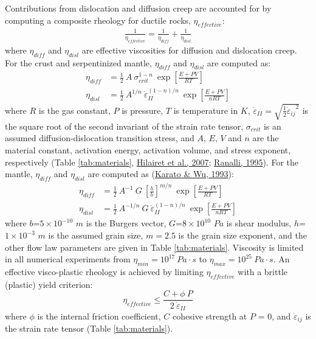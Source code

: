 Contributions from dislocation and diffusion creep are accounted for by computing a composite rheology for ductile rocks, \(\eta_{effective}\):
\begin{equation}
  \begin{aligned}
    \frac{1}{\eta_{effective}} = \frac{1}{\eta_{diff}} + \frac{1}{\eta_{disl}}
  \end{aligned} 
  \label{eq:ductile}
\end{equation}
where \(\eta_{diff}\) and \(\eta_{disl}\) are effective viscosities for diffusion and dislocation creep. For the crust and serpentinized mantle, \(\eta_{diff}\) and \(\eta_{disl}\) are computed as:
\begin{equation}
  \begin{aligned}
    \eta_{diff} &= \frac{1}{2} \ A \ \sigma_{crit}^{1-n} \ \exp\left[\frac{E+PV}{RT}\right] \\
    \eta_{disl} &= \frac{1}{2} \ A^{1/n} \ \dot{\varepsilon}_{II}^{(1-n)/n} \ \exp\left[\frac{E+PV}{nRT}\right]
  \label{eq:crust}
  \end{aligned}
\end{equation}
where \(R\) is the gas constant, \(P\) is pressure, \(T\) is temperature in \(K\), \({\dot{\varepsilon}}_{II} = \sqrt{\frac{1}{2}{{\dot{\varepsilon}}_{ij}}^{2}}\) is the square root of the second invariant of the strain rate tensor, \(\sigma_{crit}\) is an assumed diffusion-dislocation transition stress, and \(A\), \(E\), \(V\) and \(n\) are the material constant, activation energy, activation volume, and stress exponent, respectively (Table \ref{tab:materials}, \protect\hyperlink{ref-hilairet2007}{Hilairet et al., 2007}; \protect\hyperlink{ref-ranalli1995}{Ranalli, 1995}). For the mantle, \(\eta_{diff}\) and \(\eta_{disl}\) are computed as (\protect\hyperlink{ref-karato1993}{Karato \& Wu, 1993}):
\begin{equation}
  \begin{aligned}
    \eta_{diff} &= \frac{1}{2} \ A^{-1} \ G \ \left[\frac{h}{b}\right]^{m/n} \ \exp\left[\frac{E+PV}{RT}\right] \\
    \eta_{disl} &= \frac{1}{2} \ A^{-1/n} \ G \ \dot{\varepsilon}_{II}^{(1-n)/n} \ \exp\left[\frac{E+PV}{nRT}\right]
  \end{aligned}
  \label{eq:mantle}
\end{equation}
where \(b\)=\(5\times10^{-10}\) \(m\) is the Burgers vector, \(G\)=\(8\times10^{10}\) \(Pa\) is shear modulus, \(h\)=\(1\times10^{-3}\) \(m\) is the assumed grain size, \(m=2.5\) is the grain size exponent, and the other flow law parameters are given in Table \ref{tab:materials}. Viscosity is limited in all numerical experiments from \(\eta_{min} = 10^{17}\ Pa \cdot s\) to \(\eta_{max} = 10^{25}\ Pa \cdot s\). An effective visco-plastic rheology is achieved by limiting \(\eta_{effective}\) with a brittle (plastic) yield criterion:
\begin{equation}
  \eta_{effective} \leq \frac{C + \phi \ P}{2 \ \dot{\varepsilon}_{II}}
  \label{eq:plastic}
\end{equation}
where \(\phi\) is the internal friction coefficient, \(C\) cohesive strength at \(P\) = 0, and \({\dot{\varepsilon}}_{ij}\) is the strain rate tensor (Table \ref{tab:materials}).

